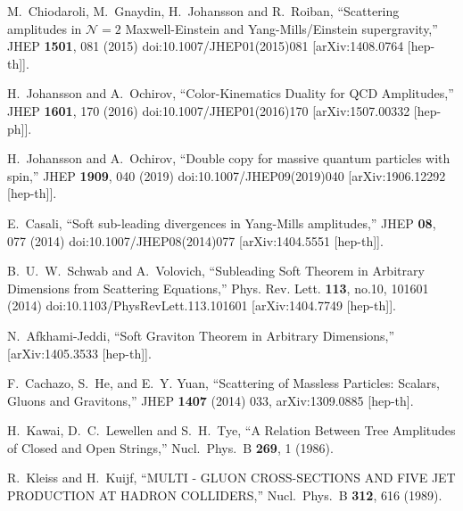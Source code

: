 \documentclass[11pt,a4paper]{article}
\begin{document}
\begin{thebibliography}{}
  M.~Chiodaroli, M.~Gnaydin, H.~Johansson and R.~Roiban,
  ``Scattering amplitudes in $ \mathcal{N}=2 $ Maxwell-Einstein and Yang-Mills/Einstein supergravity,''
  JHEP {\bf 1501}, 081 (2015)
  doi:10.1007/JHEP01(2015)081
  [arXiv:1408.0764 [hep-th]].

  H.~Johansson and A.~Ochirov,
  ``Color-Kinematics Duality for QCD Amplitudes,''
  JHEP {\bf 1601}, 170 (2016)
  doi:10.1007/JHEP01(2016)170
  [arXiv:1507.00332 [hep-ph]].

  H.~Johansson and A.~Ochirov,
  ``Double copy for massive quantum particles with spin,''
  JHEP {\bf 1909}, 040 (2019)
  doi:10.1007/JHEP09(2019)040
  [arXiv:1906.12292 [hep-th]].


E.~Casali,
``Soft sub-leading divergences in Yang-Mills amplitudes,''
JHEP \textbf{08}, 077 (2014)
doi:10.1007/JHEP08(2014)077
[arXiv:1404.5551 [hep-th]].

B.~U.~W.~Schwab and A.~Volovich,
``Subleading Soft Theorem in Arbitrary Dimensions from Scattering Equations,''
Phys. Rev. Lett. \textbf{113}, no.10, 101601 (2014)
doi:10.1103/PhysRevLett.113.101601
[arXiv:1404.7749 [hep-th]].

N.~Afkhami-Jeddi,
``Soft Graviton Theorem in Arbitrary Dimensions,''
[arXiv:1405.3533 [hep-th]].


F.~Cachazo, S.~He, and E.~Y. Yuan,
``{Scattering of Massless Particles: Scalars, Gluons and Gravitons},''
  { JHEP} {\bf 1407} (2014)
   033,
 arXiv:1309.0885 [hep-th].


  H.~Kawai, D.~C.~Lewellen and S.~H.~Tye,
  ``A Relation Between Tree Amplitudes of Closed and Open Strings,''
  Nucl.\ Phys.\ B {\bf 269}, 1 (1986).


  R.~Kleiss and H.~Kuijf,
  ``MULTI - GLUON CROSS-SECTIONS AND FIVE JET PRODUCTION AT HADRON COLLIDERS,''
  Nucl.\ Phys.\  B {\bf 312}, 616 (1989).


\end{thebibliography}
\end{document}
